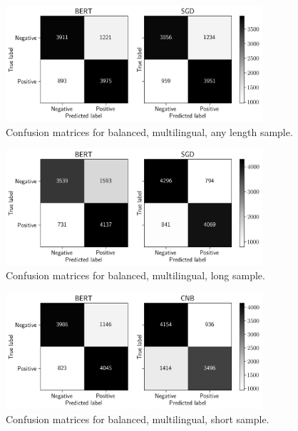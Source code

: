 \begin{figure}[!htb]
    \centering
    \includegraphics[width=0.85\textwidth]{figures/06_results/01_rfp/01_pol/01_cm/any_eq_any.png}
    \caption{Confusion matrices for balanced, multilingual, any length sample.}
    \label{fig:A1_CM_BMA}
\end{figure}

\begin{figure}[!htb]
    \centering
    \includegraphics[width=0.85\textwidth]{figures/06_results/01_rfp/01_pol/01_cm/any_eq_long.png}
    \caption{Confusion matrices for balanced, multilingual, long sample.}
    \label{fig:A1_CM_BML}
\end{figure}

\begin{figure}[!htb]
    \centering
    \includegraphics[width=0.85\textwidth]{figures/06_results/01_rfp/01_pol/01_cm/any_eq_short.png}
    \caption{Confusion matrices for balanced, multilingual, short sample.}
    \label{fig:A1_CM_BMS}
\end{figure}

